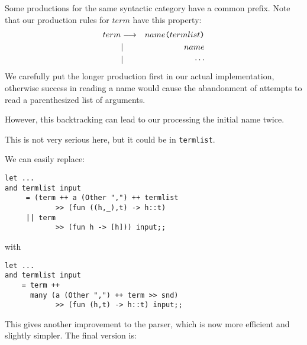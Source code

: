 \begin{slide*}


\vspace*{0.5cm}

Some productions for the same syntactic category have a common
prefix. Note that our production rules for $term$ have this property:
{\red
\begin{eqnarray*}
term     & \goesto & name{\verb!(!} termlist {\verb!)!}         \\
         & |       & name                                       \\
         & |       & \cdots
\end{eqnarray*}}
We carefully put the longer production first in our actual implementation,
otherwise success in reading a name would cause the abandonment of attempts to
read a parenthesized list of arguments.

However, this backtracking can lead to our processing the initial name twice.

This is not very serious here, but it could be in {\black \tt termlist}.

\end{slide*}



\begin{slide*}


\vspace*{0.5cm}

We can easily replace:

\begin{black}\begin{verbatim}
let ...
and termlist input
     = (term ++ a (Other ",") ++ termlist
            >> (fun ((h,_),t) -> h::t)
     || term
            >> (fun h -> [h])) input;;
\end{verbatim}\end{black}
\noindent with
\begin{black}\begin{verbatim}
let ...
and termlist input
    = term ++
      many (a (Other ",") ++ term >> snd)
            >> (fun (h,t) -> h::t) input;;
\end{verbatim}\end{black}

\noindent This gives another improvement to the parser, which is now more
efficient and slightly simpler. The final version is:

\end{slide*}




